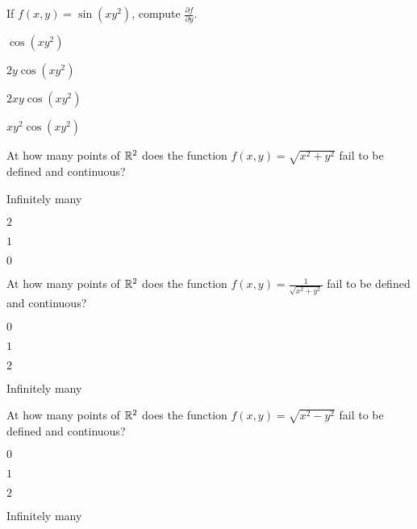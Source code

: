 \begin{readinessAssuranceTest}
\item If \(f(x,y) = \sin(xy^2)\), compute \(\frac{\partial f}{\partial y}\).
\begin{multicols}{4}
\begin{readinessAssuranceTestChoices}
\item \(\cos(xy^2)\) 
\item \(2y\cos(xy^2)\) 
\item \(2xy\cos(xy^2)\)  %
\item \(xy^2\cos(xy^2)\) 
\end{readinessAssuranceTestChoices}
\end{multicols}

\item At how many points of \(\mathbb{R}^2\) does the function \(f(x,y)=\sqrt{x^2+y^2}\) fail to be defined and continuous?
\begin{multicols}{4}
\begin{readinessAssuranceTestChoices}
\item Infinitely many
\item \(2\) 
\item \(1\)  
\item \(0\) %
\end{readinessAssuranceTestChoices}
\end{multicols}


\item At how many points of \(\mathbb{R}^2\) does the function \(f(x,y)=\frac{1}{\sqrt{x^2+y^2}}\) fail to be defined and continuous?
\begin{multicols}{4}
\begin{readinessAssuranceTestChoices}
\item \(0\) 
\item \(1\) %
\item \(2\) 
\item Infinitely many
\end{readinessAssuranceTestChoices}
\end{multicols}

\item At how many points of \(\mathbb{R}^2\) does the function \(f(x,y)=\sqrt{x^2-y^2}\) fail to be defined and continuous?
\begin{multicols}{4}
\begin{readinessAssuranceTestChoices}
\item \(0\) 
\item \(1\) 
\item \(2\) 
\item Infinitely many %
\end{readinessAssuranceTestChoices}
\end{multicols}


\end{readinessAssuranceTest}
